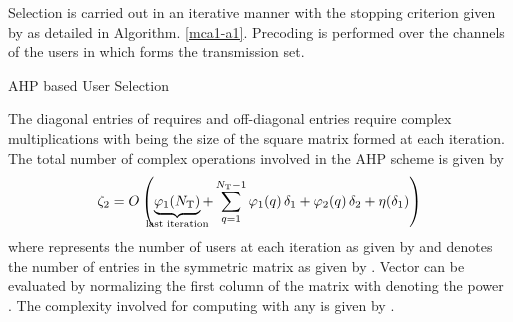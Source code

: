 Selection is carried out in an iterative manner with the stopping criterion given by  as detailed in Algorithm. \ref{mca1-a1}. Precoding is performed over the channels of the users in  which forms the transmission set.
\begin{algorithm}
 \SetAlgoLined
 \DontPrintSemicolon
 \caption{AHP based User Selection}
 \label{mca1-a1}
\end{algorithm}

The diagonal entries of  requires  and off-diagonal entries require  complex multiplications with  being the size of the square matrix  formed at each iteration. The total number of complex operations involved in the \ac{AHP} scheme is given by
\begin{eqnarray*}
\zeta_2 = O \left ( \underbrace{\varphi_1(N_\mrm{T})}_{\mathclap{\text{last iteration}}} + \sum^{N_\mrm{T} - 1}_{q = 1} \varphi_1(q) \, \delta_1 + \varphi_2(q) \, \delta_2 + \eta(\delta_1) \right )
\end{eqnarray*}
where  represents the number of users at each iteration as given by  and  denotes the number of entries in the symmetric matrix  as given by . Vector  can be evaluated by normalizing the first column of the matrix  with  denoting the power \cite{saaty2008decision}. The complexity involved for computing  with any  is given by .

